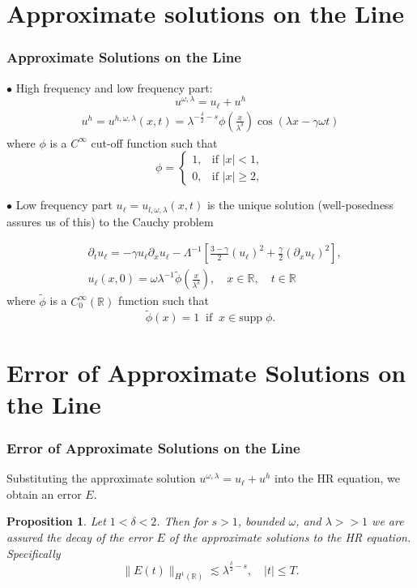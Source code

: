 \documentclass{beamer}
\newcommand{\rr}{\mathbb{R}}
\newcommand{\p}{\partial}
\newtheorem{proposition}{Proposition}
\begin{document}
\section{Approximate solutions on the Line}
\begin{frame}
	\frametitle{Approximate Solutions on the Line}
%
%
	  $\bullet$ High frequency and low frequency part:
%
%
\begin{equation*}
\label{apple1}
u^{\omega,\lambda} = u_\ell + u^h
\end{equation*}
%
%
%
%
\pause
%
%
%
%
\begin{equation*}
\begin{split}
u^h = u^{h,\omega,\lambda}(x,t) =
\lambda^{-\frac{\delta}{2} -s}
\phi \left (\frac{x}{\lambda^\delta}\right )
\cos(\lambda x - \gamma \omega t)
\end{split}
\end{equation*}
%
%
%
%
where $\phi$ is a $C^\infty$ cut-off function such that
%
%
%
%
\begin{equation*}
\phi = \begin{cases}
1, &\text{if $|x|<1$,} \\
0, &\text{if $|x| \ge 2,$} \end{cases}
\end{equation*}
%
%
%
%
\end{frame}
%
%
\begin{frame}
$\bullet$ Low frequency part $u_\ell = u_{l,
\omega, \lambda}(x,t)$ is the unique solution (well-posedness assures us of this) to the Cauchy problem

\begin{align*}
& \p_t u_\ell = -\gamma u_\ell \p_x u_\ell -
\Lambda^{-1} \left[ \frac{3-\gamma}{2}(u_\ell)^2 +
\frac{\gamma}{2} \left( \p_x u_\ell \right)^2
\right],
\\
& u_\ell(x,0) = \omega \lambda^{-1} \tilde{\phi} \left(
\frac{x}{\lambda^{\delta}}
\right), \quad x \in \rr, \quad t \in \rr
\end{align*}
%
%
%
%
where $\tilde{\phi}$ is a $C^{\infty}_0(\rr)$ function such that
%
%
%
%
\begin{equation*}
\tilde{\phi}(x) = 1 \; \;  \text{if} \; \;
x \in \text{supp} \; \phi.
\end{equation*}
\end{frame}
%
%
\section{Error of Approximate Solutions on the Line}
\begin{frame}
	\frametitle{Error of Approximate Solutions on the Line}
Substituting the
approximate solution $u^{\omega, \lambda} = u_\ell + u^h$ into the HR
equation, we obtain an error
$E$.
%
%
%
%
\begin{proposition}
Let $1<\delta<2$. Then for $s > 1$, bounded $\omega$, and
$\lambda >>1$ we are assured the decay of the error $E$ of the
approximate solutions to the HR equation. Specifically
%
%
%
\begin{equation*}
\label{E-est}
\|E(t)\|_{H^1(\rr)} \lesssim \lambda^{\frac{\delta}{2} -s}, \quad |t| \le 
T.
\end{equation*}
%
%
%
\end{proposition}
%
%
\end{frame}
%
%
\end{document}
